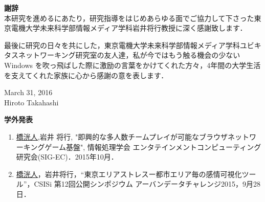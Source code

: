 \newpage
\pagestyle{plain}


\begin{flushleft}
{\huge{\bf 謝辞}}\\
 \vspace{1cm}
本研究を進めるにあたり，研究指導をはじめあらゆる面でご協力して下さった東京電機大学未来科学部情報メディア学科岩井将行教授に深く感謝致します．
 \par
最後に研究の日々を共にした，東京電機大学未来科学部情報メディア学科ユビキタスネットワーキング研究室の友人達，私が今ではもう触る機会の少ない Windows を吹っ飛ばした際に激励の言葉をかけてくれた方々，4年間の大学生活を支えてくれた家族に心から感謝の意を表します．\\

\vspace{3cm}
\begin{flushright}
March 31, 2016\\
Hiroto Takahashi\\
\end{flushright}
\end{flushleft}



\newpage




\begin{flushleft}
{\huge{\bf 学外発表}}\\
\vspace{1cm}
\begin{enumerate}

\item \underline{橋洸人},岩井 将行, "即興的な多人数チームプレイが可能なブラウザネットワーキングゲーム基盤", 情報処理学会 エンタテインメントコンピューティング研究会(SIG-EC)．2015年10月．

\item \underline{橋洸人}，岩井将行，“東京エリアストレスー都市エリア毎の感情可視化ツール”，CSISi 第12回公開シンポジウム アーバンデータチャレンジ2015，9月28日．

\end{enumerate}
\end{flushleft}

\newpage

